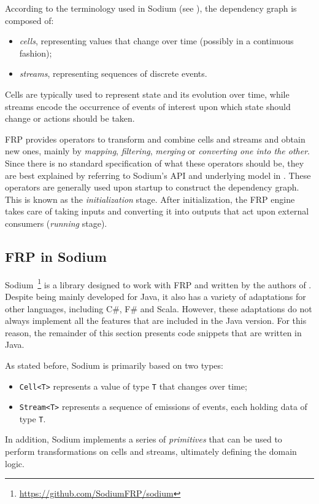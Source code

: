 According to the terminology used in Sodium (see ), the dependency graph is composed of:
%
\begin{itemize}
  \item \textit{cells}, representing values that change over time (possibly in a continuous fashion);
  \item \textit{streams}, representing sequences of discrete events.
\end{itemize}
%
Cells are typically used to represent state and its evolution over time, while streams encode the occurrence of events of interest upon which state should change or actions should be taken.

FRP provides operators to transform and combine cells and streams and obtain new ones, mainly by \textit{mapping}, \textit{filtering}, \textit{merging} or \textit{converting one into the other}.
%
Since there is no standard specification of what these operators should be, they are best explained by referring to Sodium's API and underlying model in .
%
These operators are generally used upon startup to construct the dependency graph.
%
This is known as the \textit{initialization} stage.
%
After initialization, the FRP engine takes care of taking inputs and converting it into outputs that act upon external consumers (\textit{running} stage).

\subsection{FRP in Sodium}
\label{sec:sodium}

Sodium~\footnote{\url{https://github.com/SodiumFRP/sodium}} is a library designed to work with FRP and written by the authors of \cite{blackheath2016functional}.
%
Despite being mainly developed for Java, it also has a variety of adaptations for other languages, including C\#, F\# and Scala.
%
However, these adaptations do not always implement all the features that are included in the Java version.
%
For this reason, the remainder of this section presents code snippets that are written in Java.

As stated before, Sodium is primarily based on two types:
%
\begin{itemize}
  \item \texttt{Cell<T>} represents a value of type \texttt{T} that changes over time;
  \item \texttt{Stream<T>} represents a sequence of emissions of events, each holding data of type \texttt{T}.
\end{itemize}
%
In addition, Sodium implements a series of \textit{primitives} that can be used to perform transformations on cells and streams, ultimately defining the domain logic.

